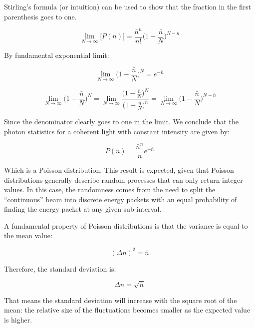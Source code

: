 \documentclass[12pt,a4paper]{report}
\begin{document}
Stirling's formula (or intuition) can be used to show that the fraction in the first parenthesis goes to one.

\begin{equation}
    \lim_{N\rightarrow\infty}\big[P(n)\big]=\frac{\bar{n}^n}{n!}\Big(1-\frac{\bar{n}}{N}\Big)^{N-n}
\end{equation}

By fundamental exponential limit:

\begin{equation}
  \lim_{N\rightarrow\infty}\Big(1-\frac{\bar{n}}{N}\Big)^N=e^{-\bar{n}}  
\end{equation}

\begin{equation*}
\lim_{N\rightarrow\infty}\Big(1-\frac{\bar{n}}{N}\Big)^N=\lim_{N\rightarrow\infty}\frac{\Big(1-\frac{\bar{n}}{N}\Big)^N}{\Big(1-\frac{\bar{n}}{N}\Big)^{\bar{n}}}=  \lim_{N\rightarrow\infty}\Big(1-\frac{\bar{n}}{N}\Big)^{N-\bar{n}}
\end{equation*}

Since the denominator clearly goes to one in the limit. We conclude that the photon statistics for a coherent light with constant intensity are given by:

\begin{equation}
    \boxed{P(n)=\frac{\bar{n}^n}{n}e^{-\bar{n}}}
\end{equation}

Which is a Poisson distribution. This result is expected, given that Poisson distributions generally describe random processes that can only return integer values. In this case, the randomness comes from the need to split the ``continuous'' beam into discrete energy packets with an equal probability of finding the energy packet at any given sub-interval.

A fundamental property of Poisson distributions is that the variance is equal to the mean value:

\begin{equation}
    (\Delta n)^2=\bar{n}
\end{equation}

Therefore, the standard deviation is:

\begin{equation}
    \Delta n=\sqrt{\bar{n}}
\end{equation}

That means the standard deviation will increase with the square root of the mean: the relative size of the fluctuations becomes smaller as the expected value is higher.
\end{document}
